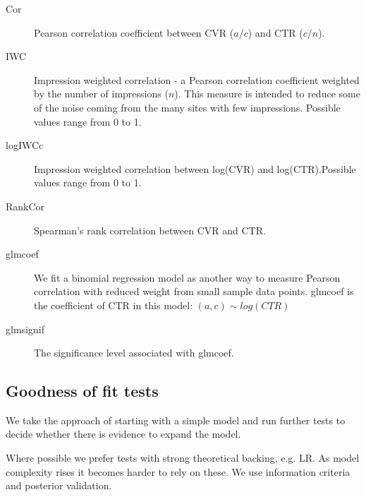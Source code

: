 \documentclass[11pt,a4,singlespacing,titlepagenumber=on]{scrreprt}
\numberwithin{equation}{chapter} %
\theoremstyle{remark}
\begin{document}
\begin{description}
	\item[Cor] Pearson correlation coefficient between CVR ($a/c$) and CTR ($c/n$).
	\item[IWC] Impression weighted correlation - a Pearson correlation coefficient weighted by the number of impressions ($n$). This measure is intended to reduce some of the noise coming from the many sites with few impressions. Possible values range from 0 to 1.
	\item[logIWCc] Impression weighted correlation between log(CVR) and log(CTR).Possible values range from 0 to 1.
	\item[RankCor] Spearman's rank correlation between CVR and CTR.
	\item[glmcoef] We fit a binomial regression model as another way to measure Pearson correlation with reduced weight from small sample data points. glmcoef is the coefficient of CTR in this model:
	$(a,c) \sim log(CTR)$ 
	\item[glmsignif] The significance level associated with glmcoef.
\end{description}


\subsection{Goodness of fit tests}

We take the approach of starting with a simple model and run further tests to decide whether there is evidence to expand the model. 

Where possible we prefer tests with strong theoretical backing, e.g. LR. As model complexity rises it becomes harder to rely on these. We use information criteria and posterior validation.
\end{document}
